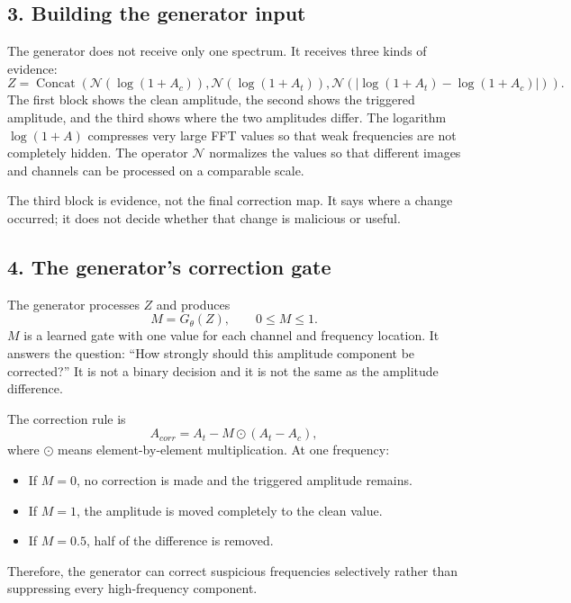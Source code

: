 \documentclass[11pt]{article}
\begin{document}
\subsection*{3. Building the generator input}
The generator does not receive only one spectrum. It receives three kinds of
evidence:
\begin{equation}
    Z=\operatorname{Concat}\left(\mathcal{N}(\log(1+A_c)),
    \mathcal{N}(\log(1+A_t)),
    \mathcal{N}\left(|\log(1+A_t)-\log(1+A_c)|\right)\right).
\end{equation}
The first block shows the clean amplitude, the second shows the triggered
amplitude, and the third shows where the two amplitudes differ. The logarithm
$\log(1+A)$ compresses very large FFT values so that weak frequencies are not
completely hidden. The operator $\mathcal{N}$ normalizes the values so that
different images and channels can be processed on a comparable scale.

The third block is evidence, not the final correction map. It says where a
change occurred; it does not decide whether that change is malicious or useful.

\subsection*{4. The generator's correction gate}
The generator processes $Z$ and produces
\begin{equation}
    M=G_\theta(Z),
    \qquad 0\leq M\leq 1.
\end{equation}
$M$ is a learned gate with one value for each channel and frequency location.
It answers the question: ``How strongly should this amplitude component be
corrected?'' It is not a binary decision and it is not the same as the
amplitude difference.

The correction rule is
\begin{equation}
    A_{corr}=A_t-M\odot(A_t-A_c),
\end{equation}
where $\odot$ means element-by-element multiplication. At one frequency:
\begin{itemize}
    \item If $M=0$, no correction is made and the triggered amplitude remains.
    \item If $M=1$, the amplitude is moved completely to the clean value.
    \item If $M=0.5$, half of the difference is removed.
\end{itemize}
Therefore, the generator can correct suspicious frequencies selectively rather
than suppressing every high-frequency component.
\end{document}

